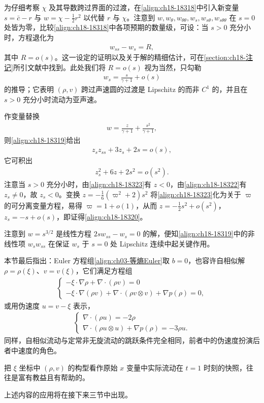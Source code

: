 \documentclass[../../main.tex]{subfiles}
\begin{document}
为仔细考察 $\chi$ 及其导数跨过界面的过渡，在\eqref{align:ch18-18318}中引入新变量 $s=\bar c-r$ 与 $w=\chi-\frac12 r^2$ 以代替 $r$ 与 $\chi$。注意到 $w,w_\theta,w_{\theta\theta},w_s,w_{s\theta},w_{s\theta\theta}$ 在 $s=0$ 处皆为零，比较\eqref{align:ch18-18318}中各项预期的数量级，可设：当 $s>0$ 充分小时，方程退化为
\begin{align}
[2s-(\gamma+1)w_s]w_{ss}-w_s=R,
\label{align:ch18-18319}
\end{align}
其中 $R=o(s)$。这一设定的证明以及关于解的精细估计，可在\cref{section:ch18-注记}所引文献中找到。此处我们将 $R=o(s)$ 视为当然，只勾勒
\begin{align}
w_s=\frac{s}{\gamma+1}+o(s)
\label{align:ch18-18320}
\end{align}
的推导；它表明 $(\rho,v)$ 跨过声速圆的过渡是 Lipschitz 的而非 $C^1$ 的，并且在 $s>0$ 充分小时流动为亚声速。

作变量替换
\begin{align}
w=\frac{z}{\gamma+1}+\frac{s^2}{\gamma+1},
\label{align:ch18-18321}
\end{align}
则\eqref{align:ch18-18319}给出
\begin{align}
z_s z_{ss}+3z_s+2s=o(s),
\label{align:ch18-18322}
\end{align}
它可积出
\begin{align}
z_s^2+6z+2s^2=o(s^2).
\label{align:ch18-18323}
\end{align}
注意当 $s>0$ 充分小时，由\eqref{align:ch18-18323}有 $z<0$，由\eqref{align:ch18-18322}有 $z_s\neq0$，故 $z_s<0$。变换 $z=-\frac16(\varpi^2+2)s^2$ 将\eqref{align:ch18-18323}化为关于 $\varpi$ 的可分离变量方程，易得 $\varpi=1+o(1)$，从而 $z=-\frac12 s^2+o(s^2)$，$z_s=-s+o(s)$，即证得\eqref{align:ch18-18320}。

注意到 $w=s^{3/2}$ 是线性方程 $2sw_{ss}-w_s=0$ 的解，便知\eqref{align:ch18-18319}中的非线性项 $w_sw_{ss}$ 在保证 $w_s$ 于 $s=0$ 处 Lipschitz 连续中起关键作用。

本节最后指出：Euler 方程组\eqref{align:ch03-等熵Euler}取 $b=0$，也容许自相似解 $\rho=\rho(\xi)$、$v=v(\xi)$，它们满足方程组
\begin{align}
\begin{cases}
-\xi\cdot\nabla\rho+\nabla\cdot(\rho v)=0\\
-\xi\cdot\nabla(\rho v)+\nabla\cdot(\rho v\otimes v)+\nabla p(\rho)=0,
\end{cases}
\label{align:ch18-18324}
\end{align}
或用伪速度 $u=v-\xi$ 表示，
\begin{align}
\begin{cases}
\nabla\cdot(\rho u)=-2\rho\\
\nabla\cdot(\rho u\otimes u)+\nabla p(\rho)=-3\rho u.
\end{cases}
\label{align:ch18-18325}
\end{align}
同样，自相似流动与定常非无旋流动的跳跃条件完全相同，前者中的伪速度扮演后者中速度的角色。

把 $\xi$ 坐标中 $(\rho,v)$ 的构型看作原始 $x$ 变量中实际流动在 $t=1$ 时刻的快照，往往是富有教益且有帮助的。

上述内容的应用将在接下来三节中出现。
\end{document}
